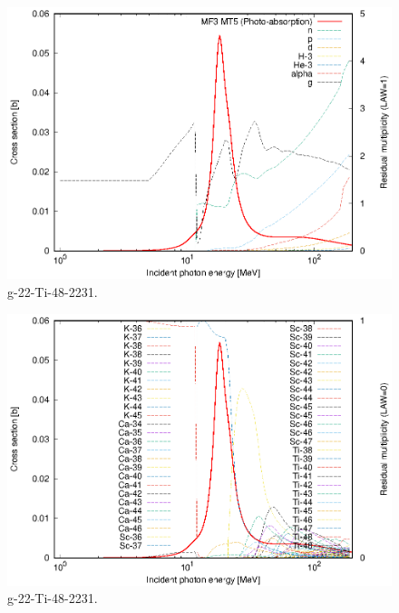\begin{figure}
 \includegraphics[width=\linewidth]{eps/g_22-Ti-48_2231.eps}
  \caption{g-22-Ti-48-2231.}
\end{figure}
\begin{figure}
 \includegraphics[width=\linewidth]{eps-law0/g_22-Ti-48_2231.eps}
 \caption{g-22-Ti-48-2231.}
\end{figure}
\newpage \clearpage

